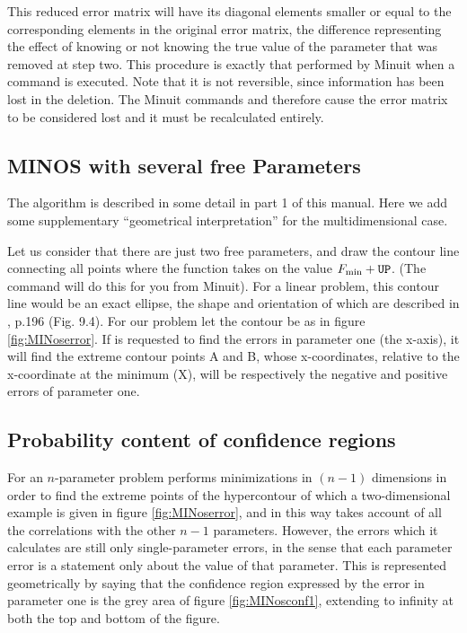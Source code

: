 This reduced error matrix will have its diagonal elements smaller or 
equal to the corresponding elements in the original error matrix, the 
difference representing the effect of knowing or not knowing the 
true value of the parameter that was removed at step two. This 
procedure is exactly that performed by Minuit when a  command 
is executed. Note that it is not reversible, since information has 
been lost in the deletion. 
The Minuit commands  and 
 therefore cause the error matrix to be considered lost and 
it must be recalculated entirely.
 
\subsection{MINOS with several free Parameters}

The  algorithm is described in some detail in part
1 of this manual.  Here we add some supplementary ``geometrical
interpretation'' for the multidimensional case.
 
Let us consider that there are just two free parameters, and draw 
the contour line connecting all points where the function takes on 
the value $F_{\mathrm{min}} + \mbox{\tt UP}$. 
(The  command will do this for you from Minuit). 
For a linear problem, this contour line would be an 
exact ellipse, the shape and orientation of which are described in 
\cite{bib-EADIE}, p.196 (Fig. 9.4). 
For our problem let the contour be as in figure \ref{fig:MINoserror}.
If  is requested to find the errors in parameter 
one (the x-axis), it will find the extreme contour points A and B, 
whose x-coordinates, relative to the x-coordinate at the minimum 
(X), will be respectively the negative and positive  errors of 
parameter one.
 
\subsection{Probability content of confidence regions}
 
For an $n$-parameter problem  performs 
minimizations in $(n-1)$
dimensions in order to find the extreme points of the hypercontour 
of which a two-dimensional example is given in figure 
\ref{fig:MINoserror}, and in this 
way takes account of all the correlations with the other $n-1$
parameters. 
However, the errors which it calculates are still only 
single-parameter errors, in the sense that each parameter error is 
a statement only about the value of that parameter. 
This is 
represented geometrically by saying that the confidence region 
expressed by the  error in parameter one is the grey
area of figure \ref{fig:MINosconf1}, 
extending to infinity at both the top and bottom of the figure.
 
